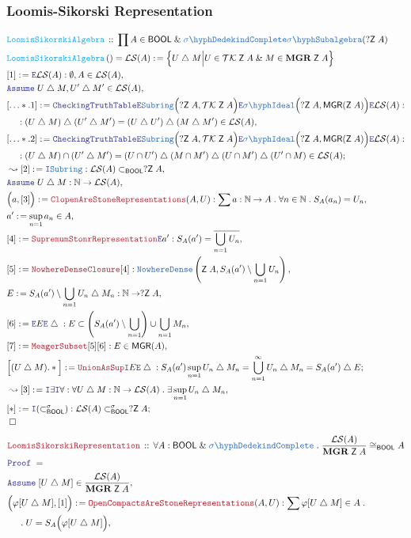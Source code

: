 \documentclass[12pt]{scrartcl}
\newcommand{\TYPE}[1]{\textcolor{NavyBlue}{\mathtt{#1}}}
\newcommand{\FUNC}[1]{\textcolor{Cerulean}{\mathtt{#1}}}
\newcommand{\LOGIC}[1]{\textcolor{Blue}{\mathtt{#1}}}
\newcommand{\THM}[1]{\textcolor{Maroon}{\mathtt{#1}}}
\renewcommand{\.}{\; . \;}
\newcommand{\de}{: \kern 0.1pc =}
\newcommand{\Act}[1]{\left( #1 \right)}
\newcommand{\Theorem}[2]{& \THM{#1} \, :: \, #2 \\ & \Proof = \\ }
\newcommand{\DeclareFunc}[2]{& \FUNC{#1} \, :: \, #2 \\}
\newcommand{\DefineNamedFunc}[4]{&  \FUNC{#1}\Act{#2} = #3 \de #4 \\}
\newcommand{\NewLine}{\\ & \kern 1pc}
\newcommand{\Page}[1]{ \begin{align*} #1 \end{align*}   }
\renewcommand{\And}{\; \& \;}
\newcommand{\Intro}{\LOGIC{I}}
\newcommand{\Elim}{\LOGIC{E}}
\newcommand{\Nat}{\mathbb{N} }
\newcommand{\du}{\; \triangle \;}
\newcommand{\Say}[3]{& #1 \de #2 : #3, \\}
\newcommand{\SayIn}[3]{& #1 \de #2 \in #3, \\}
\newcommand{\Conclude}[3]{& #1 \de #2 : #3; \\}
\newcommand{\Derive}[3]{& \leadsto #1 \de #2 : #3, \\}
\newcommand{\Assume}[2]{& \LOGIC{Assume} \; #1 : #2, \\}
\newcommand{\AssumeIn}[2]{& \LOGIC{Assume} \; #1 \in #2, \\}
\newcommand{\QED}{\; \square}
\newcommand{\EndProof}{& \QED \\}
\newcommand{\Proof}{\LOGIC{Proof} \; }
\newcommand{\Ideal}{\TYPE{Ideal}}
\newcommand{\SIdeal}{\TYPE{\sigma\hyph \Ideal}}
\newcommand{\ND}{\TYPE{NowhereDense}}
\newcommand{\TK}{\mathcal{TK}}
\newcommand{\SComplete}{\TYPE{\sigma\hyph DedekindComplete}}
\newcommand{\LS}{\mathcal{LS}}
\newcommand{\BOOL}{\mathsf{BOOL}}
\newcommand{\Z}{\mathsf{Z}}
\begin{document}
\subsubsection{Loomis-Sikorski Representation}
\Page{
	\DeclareFunc{LoomisSikorskiAlgebra}{\prod A \in \BOOL \And \SComplete \TYPE{\sigma\hyph Subalgebra}(?\Z \; A) }
	\DefineNamedFunc{LoomisSikorskiAlgebra}{}{\LS(A)}{\Big\{ U \du M  \Big|  U \in \TK\;\Z\;A \And M \in \mathbf{MGR}\;\Z\;A \Big\}}
	\Say{[1]}{\Elim \LS(A)}{ \emptyset,A \in \LS(A)}
	\AssumeIn{U \du M,U' \du M'}{\LS(A)}
	\Say{[\ldots*.1]}{
		\LOGIC{CheckingTruthTable}
		\Elim \TYPE{Subring}\Big(?\Z\;A ,\TK \;\Z\;A\Big)
		\Elim\SIdeal\Big(?\Z\;A,\mathsf{MGR}(\Z\;A)\Big)\Elim \LS(A)
	}{
		\NewLine :
		(U \du M) \du (U' \du M') =
		(U \du U') \du (M \du M') \in \LS(A)
	}
	\Conclude{[\ldots*.2]}{
		\LOGIC{CheckingTruthTable}
		\Elim \TYPE{Subring}\Big(?\Z\;A ,\TK \;\Z\;A\Big)
		\Elim\SIdeal\Big(?\Z\;A,\mathsf{MGR}(\Z\;A)\Big)\Elim \LS(A)	
	}{  
		\NewLine :
		(U  \du M) \cap (U' \du M') =  
		(U \cap U') \du (M \cap M') \du (U \cap M') \du (U' \cap M) 
		\in \LS(A)
	}
	\Derive{[2]}{\Intro \TYPE{Subring}}{ \LS(A) \subset_\BOOL ?\Z\;A   }
	\Assume{U \du M}{\Nat \to \LS(A)}
	\Say{\Big(a,[3]\Big)}{ \THM{ClopenAreStoneRepresentations}(A,U) }
	{
		\sum a : \Nat \to A \. 
		\forall n \in \Nat \.
		S_A(a_n) = U_n
	}
	\SayIn{a'}{\sup_{n=1} a_n}{A}
	\Say{[4]}{\THM{SupremumStonrRepresentation}\Elim a'}
	{
		S_A(a') = \overline{\bigcup_{n=1} U_n}
	}
	\Say{[5]}{\THM{NowhereDenseClosure}[4]}
	{
		\ND\left( \Z\;A, S_A(a') \setminus \bigcup_{n=1} U_n\right)
	}
	\Say{E}{ S_A(a') \setminus \bigcup_{n=1} U_n \du M_n}{\Nat \to ?\Z\;A}
	\Say{[6]}{\Elim E \Elim \du}
	{
		E \subset  
		\left(S_A(a') \setminus \bigcup_{n=1}\right) 
		\cup
		\bigcup_{n=1} M_n
	}
	\Say{[7]}{\THM{MeagerSubset}[5][6]}
	{
		E \in \mathsf{MGR}(A)
	}
	\Conclude{\Big[(U \du M).*\Big]}{\THM{UnionAsSup}\Intro E \Elim \du}
	{
		S_A(a') 
		\sup_{n=1} U_n \du M_n = 
		\bigcup^\infty_{n=1} U_n \du M_n =
		S_A(a') \du E
	}
	\Derive{[3]}{\Intro \exists\Intro \forall}
	{
		\forall U \du M : \Nat \to \LS(A) \. 
		\exists \sup_{n=1} U_n \du M_n
	}
	\Conclude{[*]}{\Intro (\subset_\BOOL^\sigma)}
	{
		\LS(A) \subset_\BOOL^\sigma ? \Z \; A
	}
	\EndProof
}\Page{
	\Theorem{LoomisSikorskiRepresentation}
	{
		\forall A : \BOOL \And \SComplete \. 
		\frac{\LS(A)}{\mathbf{MGR}\;\Z\;A} \cong_\BOOL A
	}
	\AssumeIn{[U \du M]}{\frac{\LS(A)}{\mathbf{MGR}\;\Z\;A}}
	\Say{\Big(\varphi[U \du M],[1] \Big)}{\THM{OpenCompactsAreStoneRepresentations}(A,U)}
	{
		\sum \varphi[U \du M] \in A \. \NewLine \. U = S_A\Big(\varphi[U \du M]\Big)
}}
\end{document}
